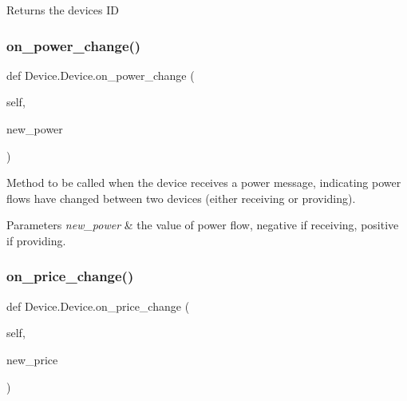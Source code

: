 \begin{DoxyReturn}{Returns}
the device\textquotesingle{}s ID 
\end{DoxyReturn}
\mbox{\label{class_device_1_1_device_ac8cec0e5eee2635bc306f765e60c2f9c}} 
\subsubsection{\texorpdfstring{on\+\_\+power\+\_\+change()}{on\_power\_change()}}
{\footnotesize\ttfamily def Device.\+Device.\+on\+\_\+power\+\_\+change (\begin{DoxyParamCaption}\item[{}]{self,  }\item[{}]{new\+\_\+power }\end{DoxyParamCaption})}



Method to be called when the device receives a power message, indicating power flows have changed between two devices (either receiving or providing). 


\begin{DoxyParams}{Parameters}
{\em new\+\_\+power} & the value of power flow, negative if receiving, positive if providing. \\
\hline
\end{DoxyParams}
\mbox{\label{class_device_1_1_device_a2e57c6f8bccdf4644b7332284651e120}} 
\subsubsection{\texorpdfstring{on\+\_\+price\+\_\+change()}{on\_price\_change()}}
{\footnotesize\ttfamily def Device.\+Device.\+on\+\_\+price\+\_\+change (\begin{DoxyParamCaption}\item[{}]{self,  }\item[{}]{new\+\_\+price }\end{DoxyParamCaption})}



